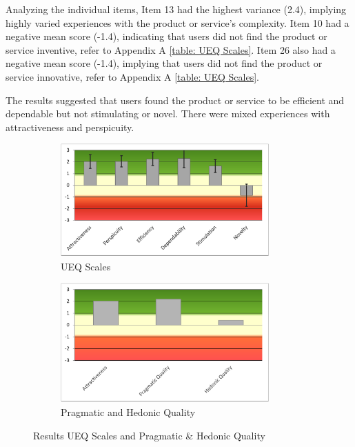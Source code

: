 \documentclass[conference,onecolumn]{IEEEtran}
\begin{document}
            Analyzing the individual items, Item 13 had the highest variance (2.4), implying highly varied experiences with the product or service's complexity. Item 10 had a negative mean score (-1.4), indicating that users did not find the product or service inventive, refer to Appendix A \tablename{ \ref{table: UEQ Scales}}. Item 26 also had a negative mean score (-1.4), implying that users did not find the product or service innovative, refer to Appendix A \tablename{ \ref{table: UEQ Scales}}.

            The results suggested that users found the product or service to be efficient and dependable but not stimulating or novel. There were mixed experiences with attractiveness and perspicuity.    
            
            \begin{figure}[H]
                \centering
                \begin{subfigure}[b]{0.45\textwidth}
                    \centerline{\includegraphics[width=80mm,scale=1]{./images/Resut_UEQ Scales.png}}
                    \caption{UEQ Scales}
                    \label{UEQ Scales}
                \end{subfigure}
                \hfill
                \begin{subfigure}[b]{0.45\textwidth}
                    \centerline{\includegraphics[width=80mm,scale=1]{./images/Results_Pragmatic and Hedonic Quality.png}}
                    \caption{Pragmatic and Hedonic Quality}
                    \label{Pragmatic and Hedonic Quality}
                \end{subfigure}
                \caption{Results UEQ Scales and Pragmatic \& Hedonic Quality}
                \label{fig:Results UEQ Scales and Pragmatic and Hedonic Quality}
            \end{figure}
\end{document}
